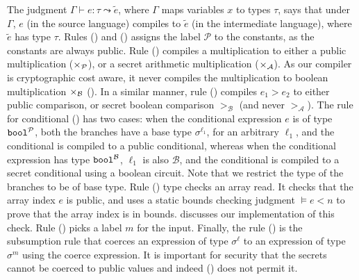 The judgment $\Gamma \vdash e : \tau \leadsto \widetilde{e}$, where
$\Gamma$ maps variables $x$ to types $\tau$, says that
under $\Gamma$, $e$ (in the source language) compiles to $\widetilde{e}$
(in the intermediate language), where $\widetilde{e}$ has type $\tau$.
Rules ({}) and ({}) assigns the label
$\mathcal{P}$ to the constants, as the constants are always
public. Rule ({})
compiles a multiplication to either a public multiplication  ($\times_{\mathcal{P}}$), or a
secret arithmetic multiplication ($\times_{\mathcal{A}}$). As
our compiler is cryptographic cost aware, it never compiles the
multiplication to boolean multiplication $\times_{\mathcal{B}}$ (). In a similar manner,
rule ({}) compiles $e_{1} > e_{2}$ to either public comparison,
or secret boolean comparison $>_\mathcal{B}$ (and never
$>_{\mathcal{A}}$).
%
The rule for conditional
({}) has two cases: when the conditional expression $e$ is of
type ${\mathtt{bool}}^{\mathcal{P}}$, both the branches have a base type
$\sigma^{\ell_{1}}$, for an arbitrary $\ell_{1}$, and the conditional is
compiled to a public conditional, whereas when the conditional
expression has type ${\mathtt{bool}}^{\mathcal{B}}$, $\ell_{1}$ is also
$\mathcal{B}$, and the conditional is compiled to a secret conditional
using a boolean circuit. Note that we restrict the type of the branches
to be of base type. 
Rule ({}) type checks an array read. It checks
that the array index $e$ is public, and uses a static bounds checking
judgment $ \models e < n$ to prove that the array index is in
bounds.  discusses our implementation of this
check. Rule ({}) picks a label $m$ for the input. Finally,
the rule ({}) is the subsumption rule that coerces an expression of
type $\sigma^{\ell}$ to an expression of type $\sigma^{m}$ using the
coerce expression. It is important for security that the secrets
cannot be coerced to public values and indeed ({}) does not
permit it.


